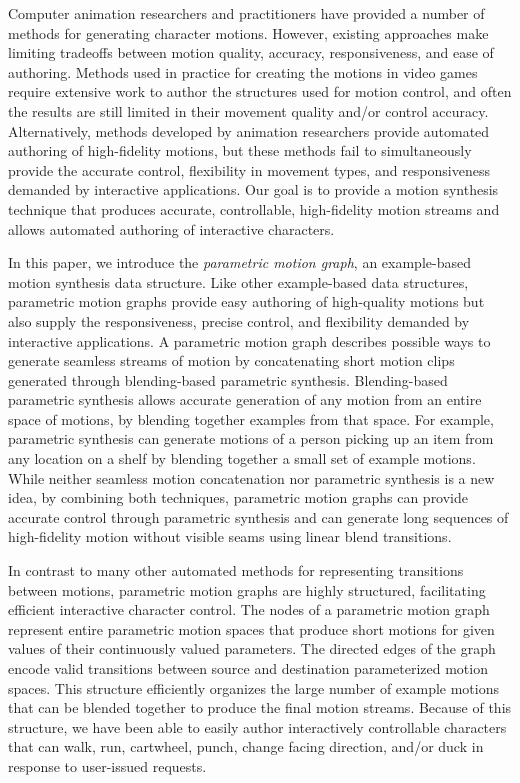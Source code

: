 \documentclass[10pt,twocolumn]{article}
\begin{document}
Computer animation researchers and practitioners have provided a number of methods for generating character motions. However, existing approaches make limiting tradeoffs between motion quality, accuracy, responsiveness, and ease of authoring. Methods used in practice for creating the motions in video games require extensive work to author the structures used for motion control, and often the results are still limited in their movement quality and/or control accuracy. Alternatively, methods developed by animation researchers provide automated authoring of high-fidelity motions, but these methods fail to simultaneously provide the accurate control, flexibility in movement types, and responsiveness demanded by interactive applications. Our goal is to provide a motion synthesis technique that produces accurate, controllable, high-fidelity motion streams and allows automated authoring of interactive characters.

In this paper, we introduce the \emph{parametric motion graph}, an example-based motion synthesis data structure. Like other example-based data structures, parametric motion graphs provide easy authoring of high-quality motions but also supply the responsiveness, precise control, and flexibility demanded by interactive applications. A parametric motion graph describes possible ways to generate seamless streams of motion by concatenating short motion clips generated through blending-based parametric synthesis. Blending-based parametric synthesis allows accurate generation of any motion from an entire space of motions, by blending together examples from that space. For example, parametric synthesis can generate motions of a person picking up an item from any location on a shelf by blending together a small set of example motions. While neither seamless motion concatenation nor parametric synthesis is a new idea, by combining both techniques, parametric motion graphs can provide accurate control through parametric synthesis and can generate long sequences of high-fidelity motion without visible seams using linear blend transitions.

In contrast to many other automated methods for representing transitions between motions, parametric motion graphs are highly structured, facilitating efficient interactive character control. The nodes of a parametric motion graph represent entire parametric motion spaces that produce short motions for given values of their continuously valued parameters. The directed edges of the graph encode valid transitions between source and destination parameterized motion spaces. This structure efficiently organizes the large number of example motions that can be blended together to produce the final motion streams. Because of this structure, we have been able to easily author interactively controllable characters that can walk, run, cartwheel, punch, change facing direction, and/or duck in response to user-issued requests.
\end{document}
